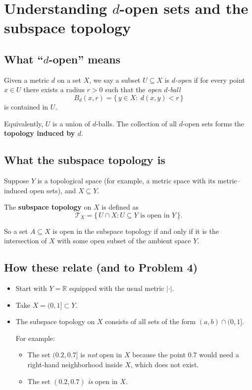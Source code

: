\documentclass[12pt,a4paper]{article}
\theoremstyle{plain}
\theoremstyle{definition}
\theoremstyle{remark}
\theoremstyle{remark}
\begin{document}
\section*{Understanding $d$-open sets and the subspace topology}

\subsection*{What ``$d$-open'' means}

Given a metric \(d\) on a set \(X\), we say a subset \(U\subseteq X\) is \emph{$d$-open}
if for every point \(x\in U\) there exists a radius \(r>0\) such that the
\emph{open $d$-ball}
\[
B_d(x,r)=\{\,y\in X:\ d(x,y)<r\,\}
\]
is contained in \(U\).

\smallskip

Equivalently, \(U\) is a union of $d$-balls.
The collection of all $d$-open sets forms the \textbf{topology induced by $d$}.

\medskip

\subsection*{What the subspace topology is}

Suppose \(Y\) is a topological space (for example, a metric space with its metric--induced open sets),
and \(X\subseteq Y\).

The \textbf{subspace topology} on \(X\) is defined as
\[
\mathcal{T}_X=\{\,U\cap X : U\subseteq Y \text{ is open in } Y\,\}.
\]

\smallskip

So a set \(A\subseteq X\) is open in the subspace topology if and only if
it is the intersection of \(X\) with some open subset of the ambient space \(Y\).

\medskip

\subsection*{How these relate (and to Problem 4)}

\begin{itemize}
	\item Start with \(Y=\mathbb{R}\) equipped with the usual metric \(|\cdot|\).
	\item Take \(X=(0,1]\subset Y\).
	\item The subspace topology on \(X\) consists of all sets of the form \((a,b)\cap(0,1]\).
	
	For example:
	\begin{itemize}
		\item The set \((0.2,0.7]\) is \emph{not} open in \(X\)
		because the point \(0.7\) would need a right-hand neighborhood inside \(X\),
		which does not exist.
		\item The set \((0.2,0.7)\) \emph{is} open in \(X\).
	\end{itemize}
\end{itemize}
\end{document}
